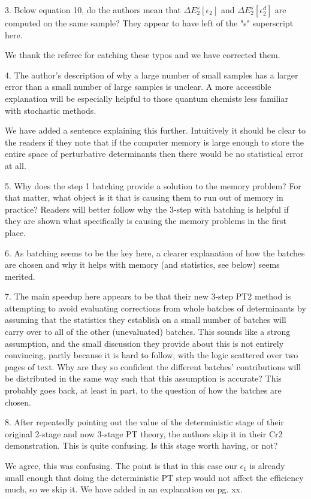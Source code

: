 \documentclass[
preprint,
onecolumn,
 superscriptaddress,
 amsmath,amssymb,
 aps,
]{revtex4-1}
\begin{document}
\vskip 5mm {\color{blue}
3. Below equation 10, do the authors mean that $\Delta E_2^s[\epsilon_2]$ and
$\Delta E_2^s[\epsilon_2^d]$ are computed on the same sample? They appear to have left of the
"s" superscript here.
}\color{black}

We thank the referee for catching these typos and we have corrected them.

\vskip 5mm {\color{blue}
4. The author's description of why a large number of small samples has a larger error than
a small number of large samples is unclear. A more accessible explanation will be especially
helpful to those quantum chemists less familiar with stochastic methods.
}\color{black}

We have added a sentence explaining this further.  Intuitively it should be clear to the readers
if they note that if the computer memory is large enough to store the entire space of perturbative
determinants then there would be no statistical error at all.

\vskip 5mm {\color{blue}
5. Why does the step 1 batching provide a solution to the memory problem? For that matter,
what object is it that is causing them to run out of memory in practice? Readers will better
follow why the 3-step with batching is helpful if they are shown what specifically is causing
the memory problems in the first place.
}\color{black}

\vskip 5mm {\color{blue}
6. As batching seems to be the key here, a clearer explanation of how the batches are chosen
and why it helps with memory (and statistics, see below) seems merited.
}\color{black}

\vskip 5mm {\color{blue}
7. The main speedup here appears to be that their new 3-step PT2 method is attempting to avoid
evaluating corrections from whole batches of determinants by assuming that the statistics
they establish on a small number of batches will carry over to all of the other (unevaluated)
batches. This sounds like a strong assumption, and the small discussion they provide about
this is not entirely convincing, partly because it is hard to follow, with the logic scattered
over two pages of text. Why are they so confident the different batches' contributions will
be distributed in the same way such that this assumption is accurate? This probably goes back,
at least in part, to the question of how the batches are chosen.
}\color{black}

\vskip 5mm {\color{blue}
8. After repeatedly pointing out the value of the deterministic stage of their original
2-stage and now 3-stage PT theory, the authors skip it in their Cr2 demonstration. This is
quite confusing. Is this stage worth having, or not?
}\color{black}

We agree, this was confusing.  The point is that in this case our $\epsilon_1$ is already
small enough that doing the deterministic PT step would not affect the efficiency much,
so we skip it.  We have added in an explanation on pg. xx.
\end{document}

